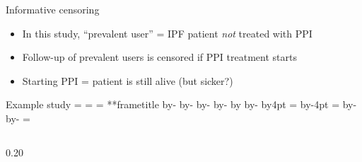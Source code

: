 \documentclass[aspectratio=169,12pt]{beamer} %
\makeatletter
\newif\ifsidebartheme
\newcommand*{\calculatespace}{%
    \contentheight=\paperheight%
    \ifx\beamer@frametitle\@empty%
        \setbox\@tempboxa=\box\voidb@x%
      \else%
        \setbox\@tempboxa=\vbox{%
          \vbox{}%
          {\parskip0pt\usebeamertemplate***{frametitle}}%
        }%
        \ifsidebartheme%
          \advance\contentheight by-1em%
        \fi%
      \fi%
    \advance\contentheight by-\ht\@tempboxa%
    \advance\contentheight by-\dp\@tempboxa%
    \advance\contentheight by-\beamer@frametopskip%
    \ifbeamer@plainframe%
    \contentbottom=0pt%
    \else%
    \advance\contentheight by-\headheight%
    \advance\contentheight by\headdp%
    \advance\contentheight by-\footheight%
    \advance\contentheight by4pt%
    \contentbottom=\footheight%
    \advance\contentbottom by-4pt%
    \fi%
    \contentwidth=\paperwidth%
    \ifbeamer@plainframe%
    \contentleft=0pt%
    \else%
    \advance\contentwidth by-\beamer@rightsidebar%
    \advance\contentwidth by-\beamer@leftsidebar\relax%
    \contentleft=\beamer@leftsidebar%
    \fi%
}
\makeatother
\begin{document}
\begin{frame}{Informative censoring}
    \begin{itemize}
	\item In this study, ``prevalent user'' = IPF patient \emph{not}
	      treated with PPI
	\item Follow-up of prevalent users is censored if PPI treatment starts
	\item Starting PPI = patient is still alive (but sicker?)
    \end{itemize}
\end{frame}

\begin{frame}{Example study}
\calculatespace%
\begin{columns}
\begin{column}{0.20\contentwidth}
\end{column}
\end{columns}
\end{frame}
\end{document}
